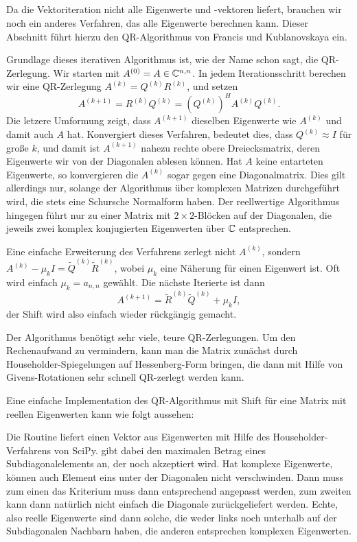 \subsection{}

Da die Vektoriteration nicht alle Eigenwerte und -vektoren liefert,
brauchen wir noch ein anderes Verfahren, das alle Eigenwerte berechnen
kann. Dieser Abschnitt führt hierzu den QR-Algorithmus von Francis und
Kublanovskaya ein.

Grundlage dieses iterativen Algorithmus ist, wie der Name schon sagt,
die QR-Zerlegung. Wir starten mit $A^{(0)} = A\in\mathbb{C}^{n,n}$. In jedem
Iterationsschritt berechen wir eine QR-Zerlegung
$A^{(k)}=Q^{(k)}R^{(k)}$, und setzen
\begin{equation}
  A^{(k+1)} = R^{(k)}Q^{(k)} = \left(Q^{(k)}\right)^HA^{(k)}Q^{(k)}.
\end{equation}
Die letzere Umformung zeigt, dass $A^{(k+1)}$ dieselben Eigenwerte wie
$A^{(k)}$ und damit auch $A$ hat. Konvergiert dieses Verfahren,
bedeutet dies, dass $Q^{(k)}\approx I$ für große $k$, und damit ist
$A^{(k+1)}$ nahezu rechte obere Dreiecksmatrix, deren Eigenwerte wir
von der Diagonalen ablesen können. Hat $A$ keine entarteten
Eigenwerte, so konvergieren die $A^{(k)}$ sogar gegen eine
Diagonalmatrix. Dies gilt allerdings nur, solange der Algorithmus über
komplexen Matrizen durchgeführt wird, die stets eine Schursche
Normalform haben. Der reellwertige Algorithmus hingegen führt nur zu
einer Matrix mit $2\times 2$-Blöcken auf der Diagonalen, die jeweils
zwei komplex konjugierten Eigenwerten über $\mathbb{C}$ entsprechen.

Eine einfache Erweiterung des Verfahrens zerlegt nicht $A^{(k)}$,
sondern $A^{(k)} - \mu_kI = \tilde{Q}^{(k)}\tilde{R}^{(k)}$, wobei $\mu_k$ eine
Näherung für einen Eigenwert ist. Oft wird einfach $\mu_k = a_{n,n}$
gewählt. Die nächste Iterierte ist dann
\begin{equation}
  A^{(k+1)} = \tilde{R}^{(k)}\tilde{Q}^{(k)} + \mu_kI,
\end{equation}
der Shift wird also einfach wieder rückgängig gemacht.

Der Algorithmus benötigt sehr viele, teure QR-Zerlegungen. Um den
Rechenaufwand zu vermindern, kann man die Matrix zunächst durch
Householder-Spiegelungen auf Hessenberg-Form bringen, die dann mit
Hilfe von Givens-Rotationen sehr schnell QR-zerlegt werden kann.

Eine einfache Implementation des QR-Algorithmus mit Shift für eine
Matrix mit reellen Eigenwerten kann wie folgt aussehen:

Die Routine liefert einen Vektor aus Eigenwerten mit Hilfe des
Householder-Verfahrens von SciPy.  gibt dabei den
maximalen Betrag eines Subdiagonalelements an, der noch akzeptiert
wird.  Hat  komplexe Eigenwerte, können auch Element eins
unter der Diagonalen nicht verschwinden. Dann muss zum einen
das Kriterium muss dann entsprechend angepasst werden, zum zweiten
kann dann natürlich nicht einfach die Diagonale zurückgeliefert
werden. Echte, also reelle Eigenwerte sind dann solche, die weder
links noch unterhalb auf der Subdiagonalen Nachbarn haben, die anderen
entsprechen komplexen Eigenwerten.

